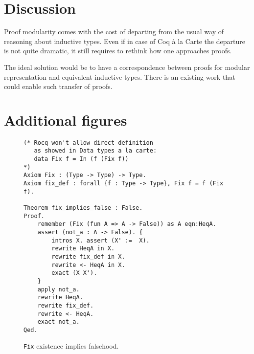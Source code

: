 \documentclass[sigplan,nonacm]{acmart}
\begin{document}

\medskip

\section{Discussion}

Proof modularity comes with the cost of departing from the usual way of reasoning about inductive types. 
Even if in case of Coq à la Carte the departure is not quite dramatic, it still requires to rethink how one approaches proofs.

The ideal solution would be to have a correspondence between proofs for modular representation and equivalent inductive types. 
There is an existing work\cite{cohen2024trocq} that could enable such transfer of proofs. 






\appendix

\section{Additional figures}

\begin{figure}[H]
\begin{lstlisting}[language=Coq]
(* Rocq won't allow direct definition
   as showed in Data types a la carte:
   data Fix f = In (f (Fix f))
*)
Axiom Fix : (Type -> Type) -> Type.
Axiom fix_def : forall {f : Type -> Type}, Fix f = f (Fix f).

Theorem fix_implies_false : False. 
Proof.
    remember (Fix (fun A => A -> False)) as A eqn:HeqA.
    assert (not_a : A -> False). { 
        intros X. assert (X' :=  X).
        rewrite HeqA in X.
        rewrite fix_def in X.
        rewrite <- HeqA in X.
        exact (X X').
    }
    apply not_a.
    rewrite HeqA.
    rewrite fix_def.
    rewrite <- HeqA.
    exact not_a.
Qed.
\end{lstlisting}
\caption{\texttt{Fix} existence implies falsehood.}
  \label{appendix:false_proof}
\end{figure}
\end{document}
